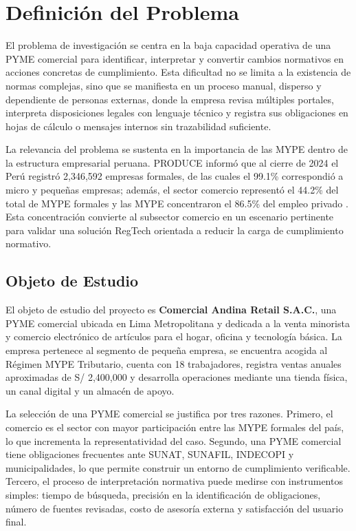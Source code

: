\documentclass[12pt,a4paper,oneside]{report}
\begin{document}
\section{Definición del Problema}\label{sec:definicion-del-problema}

El problema de investigación se centra en la baja capacidad operativa de una PYME comercial para identificar, interpretar y convertir cambios normativos en acciones concretas de cumplimiento. Esta dificultad no se limita a la existencia de normas complejas, sino que se manifiesta en un proceso manual, disperso y dependiente de personas externas, donde la empresa revisa múltiples portales, interpreta disposiciones legales con lenguaje técnico y registra sus obligaciones en hojas de cálculo o mensajes internos sin trazabilidad suficiente.

La relevancia del problema se sustenta en la importancia de las MYPE dentro de la estructura empresarial peruana. PRODUCE informó que al cierre de 2024 el Perú registró 2,346,592 empresas formales, de las cuales el 99.1\% correspondió a micro y pequeñas empresas; además, el sector comercio representó el 44.2\% del total de MYPE formales y las MYPE concentraron el 86.5\% del empleo privado \parencite{produce2025empresasformales}. Esta concentración convierte al subsector comercio en un escenario pertinente para validar una solución RegTech orientada a reducir la carga de cumplimiento normativo.

\subsection{Objeto de Estudio}\label{subsec:objeto-de-estudio}

El objeto de estudio del proyecto es \textbf{Comercial Andina Retail S.A.C.}, una PYME comercial ubicada en Lima Metropolitana y dedicada a la venta minorista y comercio electrónico de artículos para el hogar, oficina y tecnología básica. La empresa pertenece al segmento de pequeña empresa, se encuentra acogida al Régimen MYPE Tributario, cuenta con 18 trabajadores, registra ventas anuales aproximadas de S/ 2,400,000 y desarrolla operaciones mediante una tienda física, un canal digital y un almacén de apoyo.

La selección de una PYME comercial se justifica por tres razones. Primero, el comercio es el sector con mayor participación entre las MYPE formales del país, lo que incrementa la representatividad del caso. Segundo, una PYME comercial tiene obligaciones frecuentes ante SUNAT, SUNAFIL, INDECOPI y municipalidades, lo que permite construir un entorno de cumplimiento verificable. Tercero, el proceso de interpretación normativa puede medirse con instrumentos simples: tiempo de búsqueda, precisión en la identificación de obligaciones, número de fuentes revisadas, costo de asesoría externa y satisfacción del usuario final.
\end{document}
